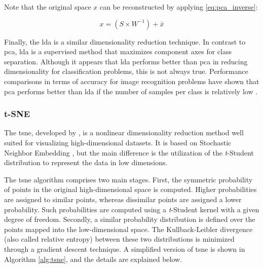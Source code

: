Note that the original space $x$ can be reconstructed by applying \autoref{eq:pca_inverse}:

\begin{equation}
\label{eq:pca_inverse}
x = (S \times W^{-1}) + \bar{x}
\end{equation}

Finally, the \acf{lda} \citep{izenman2013linear} is a similar dimensionality reduction technique. In contrast to \acs{pca}, \acs{lda} is a supervised method that maximizes component axes for class separation. Although it appears that \acs{lda} performs better than \acs{pca} in reducing dimensionality for classification problems, this is not always true. Performance comparisons in terms of accuracy for image recognition problems have shown that \acs{pca} performs better than \acs{lda} if the number of samples per class is relatively low \citep{martinez2001pca}.

\subsubsection{t-SNE}

The \acf{tsne}, developed by \cite{tsne}, is a nonlinear dimensionality reduction method well suited for visualizing high-dimensional datasets. It is based on Stochastic Neighbor Embedding \citep{sne}, but the main difference is the utilization of the \textit{t}-Student distribution to represent the data in low dimensions.

The \acs{tsne} algorithm comprises two main stages. First, the symmetric probability of points in the original high-dimensional space is computed. Higher probabilities are assigned to similar points, whereas dissimilar points are assigned a lower probability. Such probabilities are computed using a \textit{t}-Student kernel with a given degree of freedom. Secondly, a similar probability distribution is defined over the points mapped into the low-dimensional space. The Kullback-Leibler divergence (also called relative entropy) between these two distributions is minimized through a gradient descent technique. A simplified version of \acs{tsne} is shown in Algorithm \ref{alg:tsne}, and the details are explained below.

